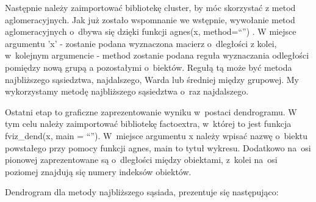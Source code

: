 \documentclass[12pt,a4paper]{report}
\begin{document}
{\begin{Shaded}
\begin{Highlighting}[]
\StringTok{ }\NormalTok{(dane_porzadkowanie[,}\NormalTok{(}\NormalTok{,}\NormalTok{,}
            \NormalTok{,}\NormalTok{,}\NormalTok{)],                                           } \NormalTok{)}
\end{Highlighting}
\end{Shaded}

Następnie należy zaimportować bibliotekę cluster, by móc skorzystać z
metod aglomeracyjnych. Jak już zostało wspomnanie we wstępnie, wywołanie
metod aglomeracyjnych o~dbywa się dzięki funkcji agnes(x, method=``'') .
W miejsce argumentu 'x' - zostanie podana wyznaczona macierz o~dległości z
kolei, w~kolejnym argumencie - method zostanie podana reguła wyznaczania
odległości pomiędzy nową grupą a pozostałymi o~biektów. Regułą tą może
być metoda najbliższego sąsiedztwa, najdalszego, Warda lub średniej
między grupowej. My wykorzystamy metodę najbliższego sąsiedztwa o~raz
najdalszego.

\begin{Shaded}
\begin{Highlighting}[]
\StringTok{ } \NormalTok{)}
\StringTok{ } \NormalTok{)}
\end{Highlighting}
\end{Shaded}

Ostatni etap to graficzne zaprezentowanie wyniku w~postaci dendrogramu.
W tym celu należy zaimportować bibliotekę factoextra, w~której to jest
funkcja fviz\_dend(x, main = ``''). W~miejsce argumentu x należy wpisać
nazwę o~biektu powstałego przy pomocy funkcji agnes, main to tytuł
wykresu. Dodatkowo na~osi pionowej zaprezentowane są o~dległości między
obiektami, z~kolei na~osi poziomej znajdują się numery indeksów
obiektów.

Dendrogram dla metody najbliższego sąsiada, prezentuje się następująco:

\begin{Shaded}
\begin{Highlighting}[]
\NormalTok{, }\NormalTok{, }
 \NormalTok{)}
\end{Highlighting}
\end{Shaded}

}
\end{document}
